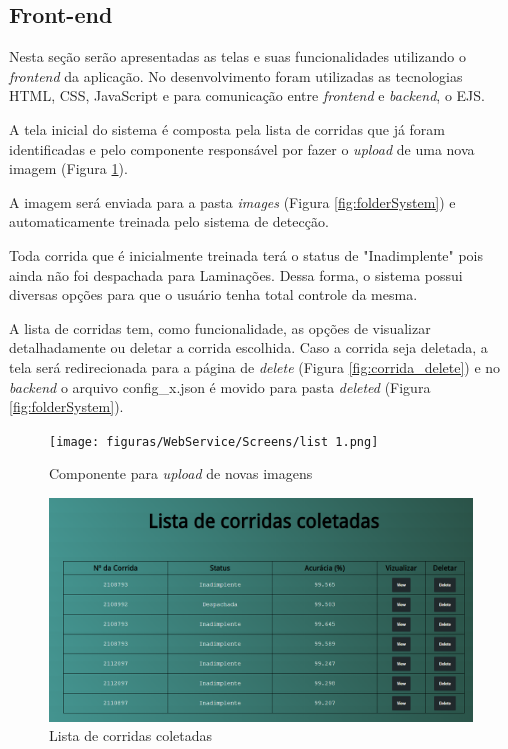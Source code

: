 \subsection{Front-end}

Nesta seção serão apresentadas as telas e suas funcionalidades utilizando o \textit{frontend} da aplicação. No desenvolvimento foram utilizadas as tecnologias HTML, CSS, JavaScript e para comunicação entre \textit{frontend} e \textit{backend}, o EJS.

A tela inicial do sistema é composta pela lista de corridas que já foram identificadas e pelo componente responsável por fazer o \textit{upload} de uma nova imagem (Figura \ref{fig:list1}).

A imagem será enviada para a pasta \textit{images} (Figura \ref{fig:folderSystem}) e automaticamente treinada pelo sistema de detecção.

Toda corrida que é inicialmente treinada terá o status de "Inadimplente" pois ainda não foi despachada para Laminações. Dessa forma, o sistema possui diversas opções para que o usuário tenha total controle da mesma.

A lista de corridas tem, como funcionalidade, as opções de visualizar detalhadamente ou deletar a corrida escolhida. Caso a corrida seja deletada, a tela será redirecionada para a página de \textit{delete} (Figura \ref{fig:corrida_delete}) e no \textit{backend} o arquivo config\_x.json é movido para pasta \textit{deleted} (Figura \ref{fig:folderSystem}).

\begin{figure}[H]
	\centering
	\texttt{[image: figuras/WebService/Screens/list  1.png]}
	\caption{Componente para \textit{upload} de novas imagens}
	\label{fig:list1}
\end{figure}

\begin{figure}[H]
	\centering
	\includegraphics[width=1\linewidth]{figuras/WebService/Screens/list 2.png}
	\caption{Lista de corridas coletadas}
	\label{fig:list2}
\end{figure}


